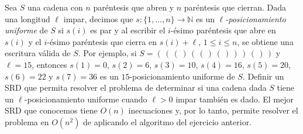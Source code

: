 
 \item Sea $S$ una cadena con $n$ paréntesis que abren y $n$ paréntesis que cierran.  Dada una longitud $\ell$ impar, decimos que $s\colon \{1,\ldots, n\} \to \mathbb{N}$ es un \emph{$\ell$-posicionamiento uniforme} de $S$ si $s(i)$ es par y al escribir el $i$-ésimo paréntesis que abre en $s(i)$ y el $i$-ésimo paréntesis que cierra en $s(i)+\ell$, $1 \leq i \leq n$, se obtiene una escritura válida de $S$. Por ejemplo, si $S = (\,(\,(\,)\,(\,(\,)\,(\,)\,)\,)\,(\,)\,)$ y $\ell = 15$, entonces $s(1) = 0$, $s(2) = 6$, $s(3) = 10$, $s(4) = 16$, $s(5) = 20$, $s(6) = 22$ y $s(7) = 36$ es un $15$-posicionamiento uniforme de $S$.  Definir un SRD que permita resolver el problema de determinar si una cadena dada $S$ tiene un $\ell$-posicionamiento uniforme cuando $\ell>0$ impar también es dado.  El mejor SRD que conocemos tiene $O(n)$ inecuaciones y, por lo tanto, permite resolver el problema en $O(n^2)$ de aplicando el algoritmo del ejercicio anterior.


